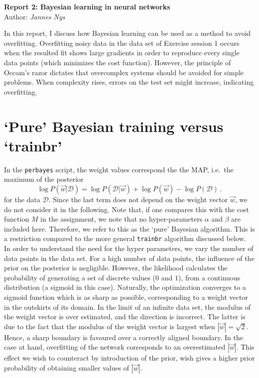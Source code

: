 \documentclass[10pt,a4paper]{article}
\begin{document}
\begin{center}
\Large\textbf{Report 2: Bayesian learning in neural networks}\\
\large Author: \textit{Jannes Nys}
\end{center}

In this report, I discuss how Bayesian learning can be used as a method to avoid overfitting. Overfitting noisy data in the data set of Exercise session 1 occurs when the resulted fit shows large gradients in order to reproduce every single data points (which minimizes the cost function). However, the principle of Occam's razor dictates that overcomplex systems should be avoided for simple problems. When complexity rises, errors on the test set might increase, indicating overfitting. 

\section{`Pure' Bayesian training versus `trainbr'}
In the \texttt{perbayes} script, the weight values correspond the the MAP, i.e.\ the maximum of the posterior
\begin{equation}
\log P(\vec{w} | \mathcal{D}) = \log P(\mathcal{D} | \vec{w}) + \log P(\vec{w}) - \log P(\mathcal{D}) \,.
\end{equation}
for the data $\mathcal{D}$. Since the last term does not depend on the weight vector $\vec{w}$, we do not consider it in the following. Note that, if one compares this with the cost function $M$ in the assignment, we note that no hyper-parameters $\alpha$ and $\beta$ are included here. Therefore, we refer to this as the `pure' Bayesian algorithm. This is a restriction compared to the more general \texttt{trainbr} algorithm discussed below.\\

In order to understand the need for the hyper parameters, we vary the number of data points in the data set. For a high number of data points, the influence of the prior on the posterior is negligible. However, the likelihood calculates the probability of generating a set of discrete values ($0$ and $1$), from a continuous distribution (a sigmoid in this case). Naturally, the optimization converges to a sigmoid function which is as sharp as possible, corresponding to a weight vector in the outskirts of its domain. In the limit of an infinite data set, the modulus of the weight vector is over estimated, and the direction is incorrect. The latter is due to the fact that the modulus of the weight vector is largest when $|\vec{w}| = \sqrt{2}$. Hence, a sharp boundary is favoured over a correctly aligned boundary. In the case at hand, overfitting of the network corresponds to an overestimated $|\vec{w}|$. This effect we wish to counteract by introduction of the prior, wish gives a higher prior probability of obtaining smaller values of $|\vec{w}|$.
\end{document}
